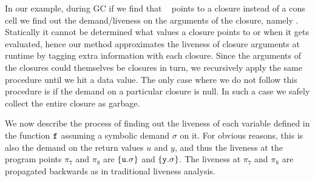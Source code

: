 \documentclass{sig-alternate}
\begin{document}
In our example, during GC if we find that \px~ points to a closure instead of a cons cell we 
find out the demand/liveness on the arguments of the closure, namely \py.
Statically it cannot be determined what values a closure points to or when it gets evaluated,
hence our method approximates the liveness of closure arguments at runtime 
by tagging extra information with each closure. Since the arguments of the closures could themselves be closures in turn, 
we recursively apply the same procedure until we hit a data value. The only case where we do not 
follow this procedure is if the demand on a particular closure is null. In such a case we safely collect 
the entire closure as garbage. 

We now describe the process of finding out the liveness 
of each variable defined in the function $\mbox{\tt f}$ assuming a symbolic demand $\sigma$ on it. 
For obvious reasons, this is also the demand on the return values $u$ and $y$, and thus the
liveness  at  the  program  points  $\pi_7$ and  $\pi_8$  are  $\lbrace
\mbox{\tt u}.\sigma \rbrace$ and $\{\mbox{\tt y}.\sigma\}$.  The liveness at $\pi_7$ and
$\pi_8$ are propagated backwards as in traditional liveness analysis.
\end{document}
